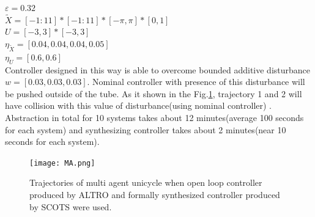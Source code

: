 $\varepsilon=0.32$\\
$\widetilde{X}=[-1:11]*[-1:11]*[-\pi,\pi]*[0,1]$\\
$U=[-3,3]*[-3,3]$\\
$\eta_{\widetilde{X}}=[0.04,0.04,0.04,0.05]$\\
$\eta_{U}=[0.6,0.6]$\\
Controller designed in this way is able to overcome bounded additive disturbance $w=[0.03,0.03,0.03]$. Nominal controller with presence of this disturbance will be pushed outside of the tube. As it shown in the Fig.\ref{fig:MA}, trajectory 1 and 2 will have collision with this value of disturbance(using nominal controller) . Abstraction in total for 10 systems takes about 12 minutes(average 100 seconds for each system) and synthesizing controller takes about 2 minutes(near 10 seconds for each system).
\begin{figure}[t]\label{fig:MA}
	\centering
	\texttt{[image: MA.png]}
	\caption{Trajectories of multi agent unicycle when open loop controller produced by ALTRO and formally synthesized controller produced by SCOTS were used.}
\end{figure}





